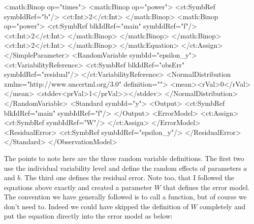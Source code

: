 \documentclass[a4paper,10pt]{article}
\begin{document}
\begin{xmlcode}
                                <math:Binop op="times">
                                    <math:Binop op="power">
                                        <ct:SymbRef symbIdRef="b"/>
                                        <ct:Int>2</ct:Int>
                                    </math:Binop>
                                    <math:Binop op="power">
                                        <ct:SymbRef blkIdRef="main" symbIdRef="f"/>
                                        <ct:Int>2</ct:Int>
                                    </math:Binop>
                                </math:Binop>
                            </math:Binop>
                            <ct:Int>2</ct:Int>
                        </math:Binop>
                    </math:Equation>
                </ct:Assign>
            </SimpleParameter>
            <RandomVariable symbId="epsilon_y">
                <ct:VariabilityReference>
                    <ct:SymbRef blkIdRef="obsErr" symbIdRef="residual"/>
                </ct:VariabilityReference>
                <NormalDistribution xmlns="http://www.uncertml.org/3.0" definition="">
                    <mean><rVal>0</rVal></mean>
                    <stddev<prVal>1</prVal>></stddev>
                </NormalDistribution>
            </RandomVariable>
            <Standard symbId="y">
                <Output>
                    <ct:SymbRef blkIdRef="main" symbIdRef="f"/>
                </Output>
                <ErrorModel>
                    <ct:Assign>
                        <ct:SymbRef symbIdRef="W"/>
                    </ct:Assign>
                </ErrorModel>
                <ResidualError>
                    <ct:SymbRef symbIdRef="epsilon_y"/>
                </ResidualError>
            </Standard>
        </ObservationModel>
\end{xmlcode}
%
The points to note here are the three random variable definitions. The
first two use the individual variability level and define the random
effects of parameters $a$ and $b$. The third one defines the residual
error. Note too, that I followed the equations above exactly and
created a parameter $W$ that defines the error model. The convention
we have generally followed is to call a function, but of course we
don't need to. Indeed we could have skipped the definition of $W$
completely and put the equation directly into the error model as
below:
%
\end{document}
